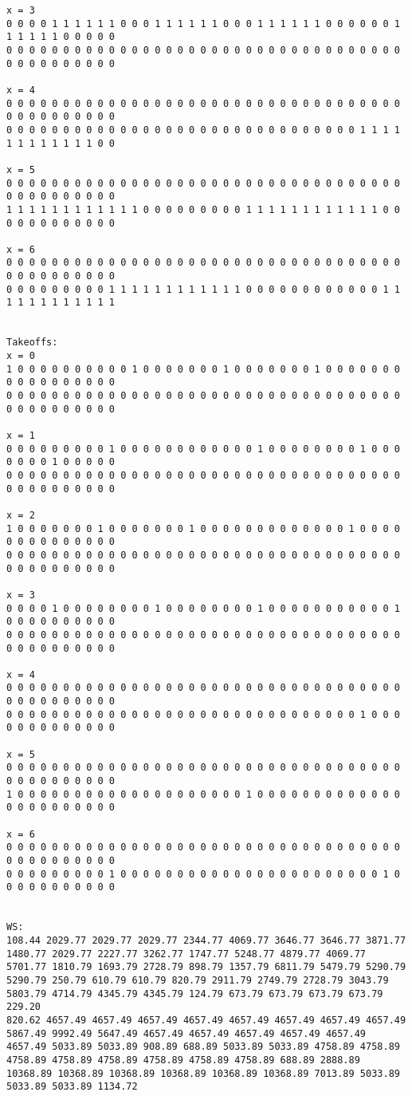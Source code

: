 \begin{lstlisting}
x = 3
0 0 0 0 1 1 1 1 1 1 0 0 0 1 1 1 1 1 1 0 0 0 1 1 1 1 1 1 0 0 0 0 0 0 1 1 1 1 1 1 0 0 0 0 0 
0 0 0 0 0 0 0 0 0 0 0 0 0 0 0 0 0 0 0 0 0 0 0 0 0 0 0 0 0 0 0 0 0 0 0 0 0 0 0 0 0 0 0 0 0 

x = 4
0 0 0 0 0 0 0 0 0 0 0 0 0 0 0 0 0 0 0 0 0 0 0 0 0 0 0 0 0 0 0 0 0 0 0 0 0 0 0 0 0 0 0 0 0 
0 0 0 0 0 0 0 0 0 0 0 0 0 0 0 0 0 0 0 0 0 0 0 0 0 0 0 0 0 0 0 1 1 1 1 1 1 1 1 1 1 1 1 0 0 

x = 5
0 0 0 0 0 0 0 0 0 0 0 0 0 0 0 0 0 0 0 0 0 0 0 0 0 0 0 0 0 0 0 0 0 0 0 0 0 0 0 0 0 0 0 0 0 
1 1 1 1 1 1 1 1 1 1 1 1 0 0 0 0 0 0 0 0 0 1 1 1 1 1 1 1 1 1 1 1 1 0 0 0 0 0 0 0 0 0 0 0 0 

x = 6
0 0 0 0 0 0 0 0 0 0 0 0 0 0 0 0 0 0 0 0 0 0 0 0 0 0 0 0 0 0 0 0 0 0 0 0 0 0 0 0 0 0 0 0 0 
0 0 0 0 0 0 0 0 0 1 1 1 1 1 1 1 1 1 1 1 1 0 0 0 0 0 0 0 0 0 0 0 0 1 1 1 1 1 1 1 1 1 1 1 1 


Takeoffs:
x = 0
1 0 0 0 0 0 0 0 0 0 0 1 0 0 0 0 0 0 0 1 0 0 0 0 0 0 0 1 0 0 0 0 0 0 0 0 0 0 0 0 0 0 0 0 0 
0 0 0 0 0 0 0 0 0 0 0 0 0 0 0 0 0 0 0 0 0 0 0 0 0 0 0 0 0 0 0 0 0 0 0 0 0 0 0 0 0 0 0 0 0 

x = 1
0 0 0 0 0 0 0 0 0 1 0 0 0 0 0 0 0 0 0 0 0 0 1 0 0 0 0 0 0 0 0 1 0 0 0 0 0 0 0 1 0 0 0 0 0 
0 0 0 0 0 0 0 0 0 0 0 0 0 0 0 0 0 0 0 0 0 0 0 0 0 0 0 0 0 0 0 0 0 0 0 0 0 0 0 0 0 0 0 0 0 

x = 2
1 0 0 0 0 0 0 0 1 0 0 0 0 0 0 0 1 0 0 0 0 0 0 0 0 0 0 0 0 0 1 0 0 0 0 0 0 0 0 0 0 0 0 0 0 
0 0 0 0 0 0 0 0 0 0 0 0 0 0 0 0 0 0 0 0 0 0 0 0 0 0 0 0 0 0 0 0 0 0 0 0 0 0 0 0 0 0 0 0 0 

x = 3
0 0 0 0 1 0 0 0 0 0 0 0 0 1 0 0 0 0 0 0 0 0 1 0 0 0 0 0 0 0 0 0 0 0 1 0 0 0 0 0 0 0 0 0 0 
0 0 0 0 0 0 0 0 0 0 0 0 0 0 0 0 0 0 0 0 0 0 0 0 0 0 0 0 0 0 0 0 0 0 0 0 0 0 0 0 0 0 0 0 0 

x = 4
0 0 0 0 0 0 0 0 0 0 0 0 0 0 0 0 0 0 0 0 0 0 0 0 0 0 0 0 0 0 0 0 0 0 0 0 0 0 0 0 0 0 0 0 0 
0 0 0 0 0 0 0 0 0 0 0 0 0 0 0 0 0 0 0 0 0 0 0 0 0 0 0 0 0 0 0 1 0 0 0 0 0 0 0 0 0 0 0 0 0 

x = 5
0 0 0 0 0 0 0 0 0 0 0 0 0 0 0 0 0 0 0 0 0 0 0 0 0 0 0 0 0 0 0 0 0 0 0 0 0 0 0 0 0 0 0 0 0 
1 0 0 0 0 0 0 0 0 0 0 0 0 0 0 0 0 0 0 0 0 1 0 0 0 0 0 0 0 0 0 0 0 0 0 0 0 0 0 0 0 0 0 0 0 

x = 6
0 0 0 0 0 0 0 0 0 0 0 0 0 0 0 0 0 0 0 0 0 0 0 0 0 0 0 0 0 0 0 0 0 0 0 0 0 0 0 0 0 0 0 0 0 
0 0 0 0 0 0 0 0 0 1 0 0 0 0 0 0 0 0 0 0 0 0 0 0 0 0 0 0 0 0 0 0 0 1 0 0 0 0 0 0 0 0 0 0 0 


WS:
108.44 2029.77 2029.77 2029.77 2344.77 4069.77 3646.77 3646.77 3871.77 1480.77 2029.77 2227.77 3262.77 1747.77 5248.77 4879.77 4069.77 5701.77 1810.79 1693.79 2728.79 898.79 1357.79 6811.79 5479.79 5290.79 5290.79 250.79 610.79 610.79 820.79 2911.79 2749.79 2728.79 3043.79 5803.79 4714.79 4345.79 4345.79 124.79 673.79 673.79 673.79 673.79 229.20
820.62 4657.49 4657.49 4657.49 4657.49 4657.49 4657.49 4657.49 4657.49 5867.49 9992.49 5647.49 4657.49 4657.49 4657.49 4657.49 4657.49 4657.49 5033.89 5033.89 908.89 688.89 5033.89 5033.89 4758.89 4758.89 4758.89 4758.89 4758.89 4758.89 4758.89 4758.89 688.89 2888.89 10368.89 10368.89 10368.89 10368.89 10368.89 10368.89 7013.89 5033.89 5033.89 5033.89 1134.72
\end{lstlisting}
